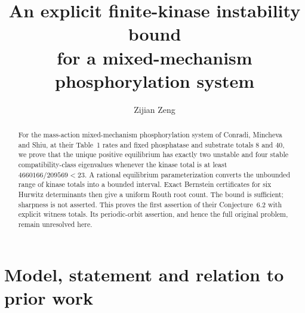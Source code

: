 \documentclass[11pt]{article}
\title{An explicit finite-kinase instability bound\protect\\
for a mixed-mechanism phosphorylation system}
\author{Zijian Zeng}
\date{}
\begin{document}
\maketitle
\begin{abstract}
For the mass-action mixed-mechanism phosphorylation system of Conradi,
Mincheva and Shiu, at their Table~1 rates and fixed phosphatase and substrate
totals $8$ and $40$, we prove that the unique positive equilibrium has exactly
two unstable and four stable compatibility-class eigenvalues whenever the
kinase total is at least $4660166/209569<23$. A rational equilibrium
parameterization converts the unbounded range of kinase totals into a bounded
interval. Exact Bernstein certificates for six Hurwitz determinants then
give a uniform Routh root count. The bound is sufficient; sharpness is not
asserted. This proves the first assertion of their Conjecture~6.2 with explicit
witness totals. Its periodic-orbit assertion, and hence the full original
problem, remain unresolved here.
\end{abstract}

\section{Model, statement and relation to prior work}
\end{document}
